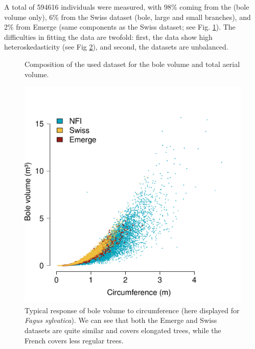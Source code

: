 A total of \num{594616} individuals were measured, with 98\% coming from the \NFI{} (bole volume only), 6\% from the Swiss dataset (bole, large and small branches), and 2\% from Emerge (same components as the Swiss dataset; see Fig. \ref{fig::compo}). The difficulties in fitting the data are twofold: first, the data show high heteroskedasticity (see Fig \ref{fig::fagSyl}), and second, the datasets are unbalanced.

\begin{figure}
	\centering
	
	\caption{Composition of the used dataset for the bole volume and total aerial volume.\label{fig::compo}}
\end{figure}

\begin{figure}
	\centering
	\includegraphics[scale = 0.5]{Figures/resp_fagus.pdf}
	\caption{Typical response of bole volume to circumference (here displayed for \textit{Fagus sylvatica}). We can see that both the Emerge and Swiss datasets \parencite{Deleuze2013,Didion2024} are quite similar and covers elongated trees, while the French \NFI{} covers less regular trees. \label{fig::fagSyl}}
\end{figure}
